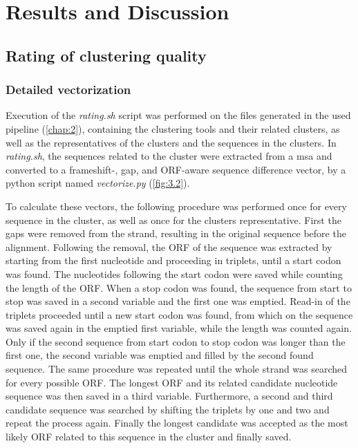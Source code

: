 \chapter{Results and Discussion} \label{chap:3}

    \section{Rating of clustering quality}
    
    \subsection{Detailed vectorization}
    
    Execution of the \textit{rating.sh} script was performed on the files generated in the used pipeline (\autoref{chap:2}), containing the clustering tools and their related clusters, as well as the representatives of the clusters and the sequences in the clusters. In \textit{rating.sh}, the sequences related to the cluster were extracted from a \gls{msa} and converted to a frameshift-, gap, and \gls{ORF}-aware sequence difference vector, by a python script named \textit{vectorize.py} (\autoref{fig:3.2}). 
    
    To calculate these vectors, the following procedure was performed once for every sequence in the cluster, as well as once for the clusters representative. First the gaps were removed from the strand, resulting in the original sequence before the alignment. Following the removal, the \gls{ORF} of the sequence was extracted by starting from the first nucleotide and proceeding in triplets, until a start codon was found. The nucleotides following the start codon were saved while counting the length of the \gls{ORF}. When a stop codon was found, the sequence from start to stop was saved in a second variable and the first one was emptied. Read-in of the triplets proceeded until a new start codon was found, from which on the sequence was saved again in the emptied first variable, while the length was counted again. Only if the second sequence from start codon to stop codon was longer than the first one, the second variable was emptied and filled by the second found sequence. The same procedure was repeated until the whole strand was searched for every possible \gls{ORF}. The longest \gls{ORF} and its related candidate nucleotide sequence was then saved in a third variable. Furthermore, a second and third candidate sequence was searched by shifting the triplets by one and two and repeat the process again. Finally the longest candidate was accepted as the most likely \gls{ORF} related to this sequence in the cluster and finally saved.
    
